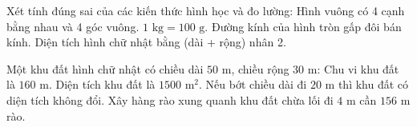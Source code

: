 \begin{ex} %
Xét tính đúng sai của các kiến thức hình học và đo lường:
\choiceTF
{\True Hình vuông có 4 cạnh bằng nhau và 4 góc vuông.}
{$1\text{ kg} = 100\text{ g}$.}
{\True Đường kính của hình tròn gấp đôi bán kính.}
{Diện tích hình chữ nhật bằng (dài + rộng) nhân 2.}
\end{ex}

\begin{ex} %
Một khu đất hình chữ nhật có chiều dài $50\text{ m}$, chiều rộng $30\text{ m}$:
\choiceTF
{\True Chu vi khu đất là $160\text{ m}$.}
{\True Diện tích khu đất là $1500\text{ m}^2$.}
{Nếu bớt chiều dài đi $20\text{ m}$ thì khu đất có diện tích không đổi.}
{\True Xây hàng rào xung quanh khu đất chừa lối đi $4\text{ m}$ cần $156\text{ m}$ rào.}
\end{ex}

